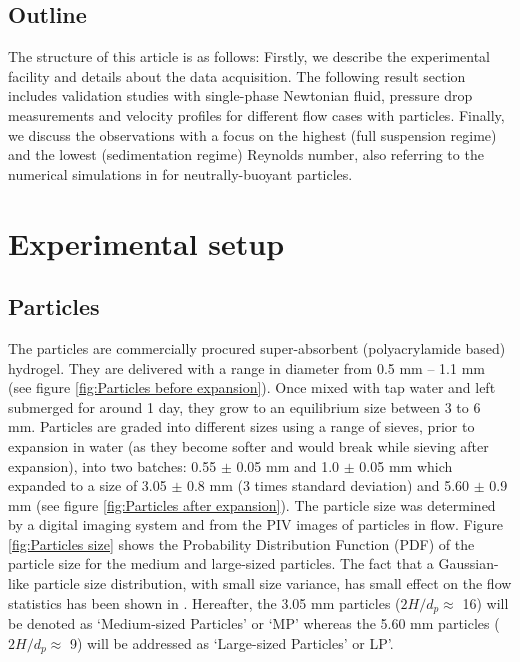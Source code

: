 \documentclass{jfm}
\begin{document}
\subsection{Outline}\label{sec:Outline}
The structure of this article is as follows: Firstly, we describe the experimental facility and details about the data acquisition. The following result section includes validation studies with single-phase Newtonian fluid, pressure drop measurements and velocity profiles for different flow cases with particles. 
Finally, we discuss the observations with a focus on the highest (full suspension regime) and the lowest (sedimentation regime) Reynolds number, also referring to the numerical simulations in \citet{fornari2017suspensions} for neutrally-buoyant particles.

\section{Experimental setup}\label{sec:Experimental setup}
\subsection{Particles}\label{sec:Particles}
The particles are commercially procured super-absorbent (polyacrylamide based) hydrogel. They are delivered with a range in diameter from 0.5 mm -- 1.1 mm (see figure \ref{fig:Particles before expansion}). Once mixed with tap water and left submerged for around 1 day, they grow to an equilibrium size between 3 to 6 mm. Particles are graded into different sizes using a range of sieves, prior to expansion in water (as they become softer and would break while sieving after expansion), into two batches: 0.55 $\pm$ 0.05 mm and 1.0 $\pm$ 0.05 mm which expanded to a size of 3.05 $\pm$ 0.8 mm (3 times standard deviation) and 5.60 $\pm$ 0.9 mm (see figure \ref{fig:Particles after expansion}). The particle size was determined by a digital imaging system and from the PIV images of particles in flow. Figure \ref{fig:Particles size} shows the Probability Distribution Function (PDF) of the particle size for the medium and large-sized particles. The fact that a Gaussian-like particle size distribution, with small size variance, has small effect on the flow statistics has been shown in \cite{FORNARI201854}. Hereafter, the 3.05 mm particles ($2H/d_{p}\approx$ 16) will be denoted as `Medium-sized Particles' or `MP' whereas the 5.60 mm particles ($2H/d_{p}\approx$ 9) will be addressed as `Large-sized Particles' or LP'.
\end{document}
